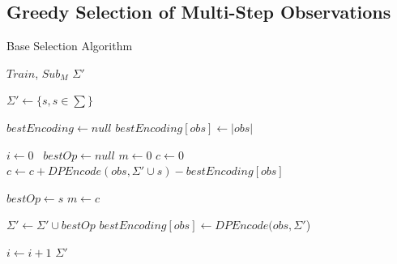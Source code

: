 \documentclass[letterpaper]{article}
\begin{document}
\subsection{Greedy Selection of Multi-Step Observations}

%
%
%
%
%

\begin{algorithm}
\caption{Base Selection Algorithm}
\label{Base Selection Algorithm}
\begin{algorithmic}[1]
\INPUT $Train$, $Sub_M$
\OUTPUT $\Sigma'$

\State $\Sigma' \gets \{s, s \in \sum \}$

\State $bestEncoding \gets null$
	\State $bestEncoding[obs] \gets |obs|$
\EndFor

\State $i \gets 0$\
	\State $bestOp \gets null$
	\State $m \gets 0$
		\State $c \gets 0$
			\State $c \gets c+DPEncode(obs, \Sigma' \cup s)-bestEncoding[obs]$
		\EndFor
		
			\State $bestOp \gets s$
			\State $m \gets c$
		\EndIf
		
	\EndFor

	\State $\Sigma' \gets \Sigma' \cup bestOp$
		\State $bestEncoding[obs] \gets DPEncode(obs,\Sigma'$) 
	\EndFor	
	
	\State $i \gets i + 1$
\EndWhile 
\State \Return $\Sigma'$

\EndProcedure
\end{algorithmic}
\end{algorithm}
\end{document}
